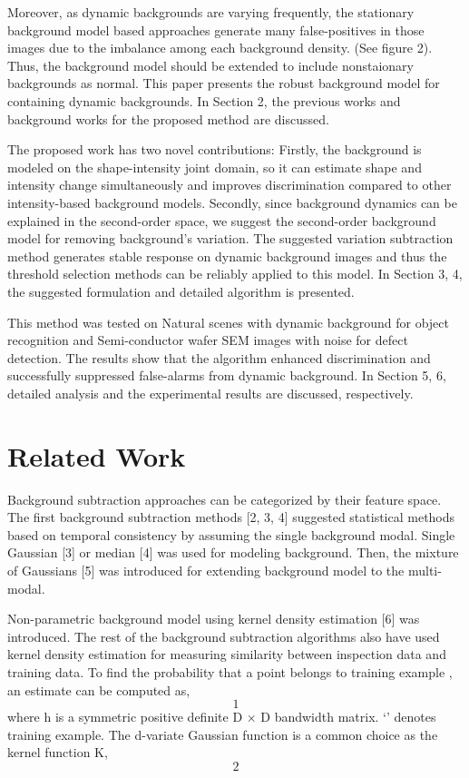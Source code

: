 \documentclass[a4paper,twocolumn, 10pt]{article}
\begin{document}
Moreover, as dynamic backgrounds are varying frequently, the stationary background model based approaches generate many false-positives in those images due to the imbalance among each background density. (See figure 2). Thus, the background model should be extended to include nonstaionary backgrounds as normal. 
This paper presents the robust background model for containing dynamic backgrounds. In Section 2, the previous works and background works for the proposed method are discussed. 

The proposed work has two novel contributions: Firstly, the background is modeled on the shape-intensity joint domain, so it can estimate shape and intensity change simultaneously and improves discrimination compared to other intensity-based background models. Secondly, since background dynamics can be explained in the second-order space, we suggest the second-order background model for removing background’s variation. The suggested variation subtraction method generates stable response on dynamic background images and thus the threshold selection methods can be reliably applied to this model. In Section 3, 4, the suggested formulation and detailed algorithm is presented.

This method was tested on Natural scenes with dynamic background for object recognition and Semi-conductor wafer SEM images with noise for defect detection. The results show that the algorithm enhanced discrimination and successfully suppressed false-alarms from dynamic background. In Section 5, 6, detailed analysis and the experimental results are discussed, respectively.



\section{Related Work}

Background subtraction approaches can be categorized by their feature space. The first background subtraction methods [2, 3, 4] suggested statistical methods based on temporal consistency by assuming the single background modal. Single Gaussian [3] or median [4] was used for modeling background. Then, the mixture of Gaussians [5] was introduced for extending background model to the multi-modal. 

Non-parametric background model using kernel density estimation [6] was introduced. The rest of the background subtraction algorithms also have used kernel density estimation for measuring similarity between inspection data and training data. To find the probability that a point   belongs to training example  , an estimate can be computed as,
\begin{equation}
  1
\end{equation}
where h is a symmetric positive definite D × D bandwidth matrix. ‘’ denotes training example. The d-variate Gaussian function is a common choice as the kernel function K, 
\begin{equation}
  2
\end{equation}
\end{document}
